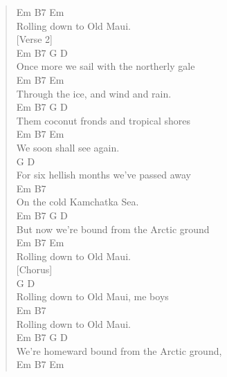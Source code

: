 \documentclass[11pt]{article}
\begin{document}
\begin{verse}
\hspace*{8em}Em      B7    Em\\
Rolling down to Old Maui.\\
\vspace*{1em}
[Verse 2]\\
\hspace*{5em}Em      B7            G         D\\
Once more we sail with the northerly gale\\
\hspace*{12em}Em       B7       Em\\
Through the ice, and wind and rain.\\
\hspace*{5em}Em      B7         G        D\\
Them coconut fronds and tropical shores\\
\hspace*{3em}Em         B7   Em\\
We soon shall see again.\\
\hspace*{8em}G                    D\\
For six hellish months we've passed away\\
\hspace*{7em}Em             B7\\
On the cold Kamchatka Sea.\\
\hspace*{4em}Em        B7             G      D\\
But now we're bound from the Arctic ground\\
\hspace*{8em}Em      B7    Em\\
Rolling down to Old Maui.\\
\vspace*{1em}
[Chorus]\\
\hspace*{8em}G             D\\
Rolling down to Old Maui, me boys\\
\hspace*{8em}Em            B7\\
Rolling down to Old Maui.\\
\hspace*{6em}Em       B7             G      D\\
We're homeward bound from the Arctic ground,\\
\hspace*{8em}Em      B7    Em\\

\end{verse}
\end{document}
